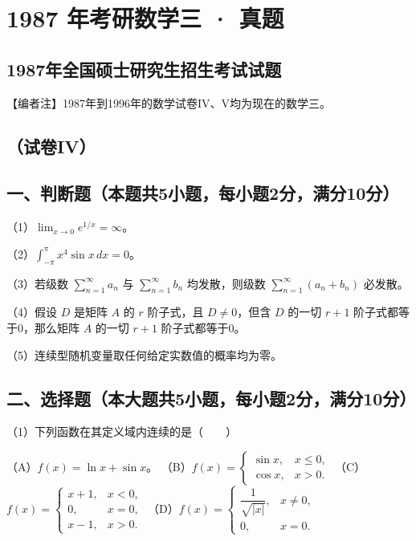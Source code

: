 \documentclass[UTF8,12pt]{ctexart}
\begin{document}
\section*{1987 年考研数学三 · 真题}
\subsection*{1987年全国硕士研究生招生考试试题}

【编者注】1987年到1996年的数学试卷IV、V均为现在的数学三。


\subsection*{（试卷IV）}

\subsection*{一、判断题（本题共5小题，每小题2分，满分10分）}

（1）\(\displaystyle \lim_{x\to0}e^{1/x}=\infty\)。


（2）\(\displaystyle \int_{-\pi}^{\pi}x^4\sin x\,dx=0\)。


（3）若级数 \(\displaystyle \sum_{n=1}^{\infty}a_n\) 与 \(\displaystyle \sum_{n=1}^{\infty}b_n\) 均发散，则级数 \(\displaystyle \sum_{n=1}^{\infty}(a_n+b_n)\) 必发散。


（4）假设 \(\displaystyle D\) 是矩阵 \(\displaystyle A\) 的 \(\displaystyle r\) 阶子式，且 \(\displaystyle D\ne0\)，但含 \(\displaystyle D\) 的一切 \(\displaystyle r+1\) 阶子式都等于0，那么矩阵 \(\displaystyle A\) 的一切 \(\displaystyle r+1\) 阶子式都等于0。


（5）连续型随机变量取任何给定实数值的概率均为零。


\subsection*{二、选择题（本大题共5小题，每小题2分，满分10分）}

（1）下列函数在其定义域内连续的是（　　）


（A）\(\displaystyle f(x)=\ln x+\sin x\)。 （B）\(\displaystyle f(x)=\begin{cases}\sin x,\allowbreak &x\le0,\allowbreak \\\cos x,\allowbreak &x>0.\end{cases}\) （C）\(\displaystyle f(x)=\begin{cases}x+1,\allowbreak &x<0,\allowbreak \\0,\allowbreak &x=0,\allowbreak \\x-1,\allowbreak &x>0.\end{cases}\) （D）\(\displaystyle f(x)=\begin{cases}\dfrac{\displaystyle 1}{\displaystyle \sqrt{|x|}},\allowbreak &x\ne0,\allowbreak \\0,\allowbreak &x=0.\end{cases}\)
\end{document}
